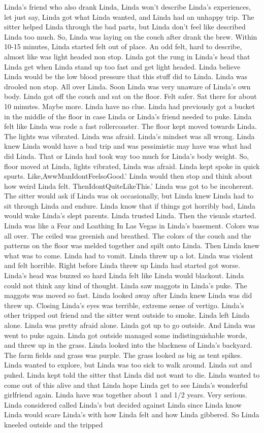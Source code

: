\documentclass[12pt]{book}
\begin{document}
Linda's friend who also drank Linda, Linda won't describe Linda's experiences, let just say, Linda got what Linda wanted, and Linda had an unhappy trip. The sitter helped Linda through the bad parts, but Linda don't feel like described Linda too much. So, Linda was laying on the couch after drank the brew. Within 10-15 minutes, Linda started felt out of place. An odd felt, hard to describe, almost like was light headed non stop. Linda got the rung in Linda's head that Linda get when Linda stand up too fast and get light headed. Linda believe Linda would be the low blood pressure that this stuff did to Linda. Linda was drooled non stop. All over Linda. Soon Linda was very unaware of Linda's own body. Linda got off the couch and sat on the floor. Felt safer. Sat there for about 10 minutes. Maybe more. Linda have no clue. Linda had previously got a bucket in the middle of the floor in case Linda or Linda's friend needed to puke. Linda felt like Linda was rode a fast rollercoaster. The floor kept moved towards Linda. The lights was vibrated. Linda was afraid. Linda's mindset was all wrong. Linda knew Linda would have a bad trip and was pessimistic may have was what had did Linda. That or Linda had took way too much for Linda's body weight. So, floor moved at Linda, lights vibrated, Linda was afraid. Linda kept spoke in quick spurts. Like,AwwManIdontFeelsoGood.' Linda would then stop and think about how weird Linda felt. ThenIdontQuiteLikeThis.' Linda was got to be incoherent. The sitter would ask if Linda was ok occasionally, but Linda knew Linda had to sit through Linda and endure. Linda know that if things got horribly bad, Linda would wake Linda's slept parents. Linda trusted Linda. Then the visuals started. Linda was like a Fear and Loathing In Las Vegas in Linda's basement. Colors was all over. The ceiled was greenish and breathed. The colors of the couch and the patterns on the floor was melded together and spilt onto Linda. Then Linda knew what was to come. Linda had to vomit. Linda threw up a lot. Linda was violent and felt horrible. Right before Linda threw up Linda had started got worse. Linda's head was buzzed so hard Linda felt like Linda would blackout. Linda could not think any kind of thought. Linda saw maggots in Linda's puke. The maggots was moved so fast. Linda looked away after Linda knew Linda was did threw up. Closing Linda's eyes was terrible, extreme sense of vertigo. Linda's other tripped out friend and the sitter went outside to smoke. Linda left Linda alone. Linda was pretty afraid alone. Linda got up to go outside. And Linda was went to puke again. Linda got outside managed some indistinguishable words, and threw up in the grass. Linda looked into the blackness of Linda's backyard. The farm fields and grass was purple. The grass looked as big as tent spikes. Linda wanted to explore, but Linda was too sick to walk around. Linda sat and puked. Linda kept told the sitter that Linda did not want to die. Linda wanted to come out of this alive and that Linda hope Linda get to see Linda's wonderful girlfriend again. Linda have was together about 1 and 1/2 years. Very serious. Linda considered called Linda's but decided against Linda since Linda know Linda would scare Linda's with how Linda felt and how Linda gibbered. So Linda kneeled outside and the tripped 
\end{document}
